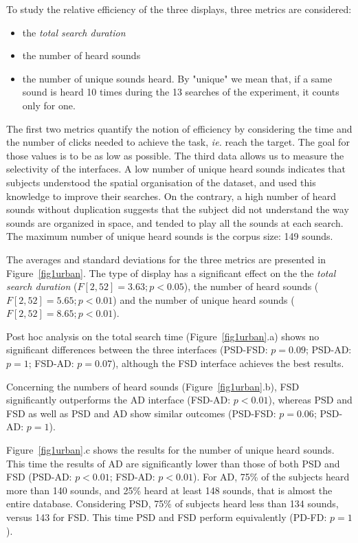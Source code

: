 \documentclass{aes2e}
\begin{document}
To study the relative efficiency of the three displays, three metrics are considered: 

\begin{itemize}
\item the \textit{total search duration}
\item the number of heard sounds
\item the number of unique sounds heard. By "unique" we mean that, if a same sound is heard 10 times during the 13 searches of the  experiment, it counts only for one. 
\end{itemize}

The first two metrics quantify the notion of efficiency by considering the time and the number of clicks needed to achieve the task, \textit{ie.} reach the target. The goal for those values is to be as low as possible. The third data allows us to measure the selectivity of the interfaces. A low number of unique heard sounds indicates that subjects understood the spatial organisation of the dataset, and used this knowledge to improve their searches. On the contrary, a high number of heard sounds without duplication suggests that the subject did not understand the way sounds are organized in space, and tended to play all the sounds at each search. The maximum number of unique heard sounds is the corpus size: 149 sounds.

The averages and standard deviations for the three metrics are presented in Figure~\ref{fig1urban}. The type of display has a significant effect on the the \textit{total search duration} ($F[2,52]=3.63; p<0.05$), the number of heard sounds ($F[2,52]=5.65; p<0.01$) and the number of unique heard sounds ($F[2,52]=8.65; p<0.01$). 

Post hoc analysis on the total search time (Figure~\ref{fig1urban}.a) shows no significant differences between the three interfaces (PSD-FSD: $p=0.09$; PSD-AD: $p=1$; FSD-AD: $p=0.07$), although the FSD interface achieves the best results.

Concerning the numbers of heard sounds (Figure~\ref{fig1urban}.b), FSD significantly outperforms the AD interface (FSD-AD: $p<0.01$),  whereas PSD and FSD as well as PSD and AD show similar outcomes (PSD-FSD: $p=0.06$; PSD-AD: $p=1$).

Figure~\ref{fig1urban}.c shows the results for the number of unique heard sounds. This time the results of AD are significantly lower than those of both PSD and FSD (PSD-AD: $p<0.01$; FSD-AD: $p<0.01$).  For AD, 75\% of the subjects heard more than 140 sounds, and 25\% heard at least 148 sounds, that is almost the entire database. Considering PSD, 75\% of subjects heard less than 134 sounds, versus 143 for FSD. This time PSD and FSD perform equivalently (PD-FD: $p=1$).
\end{document}
